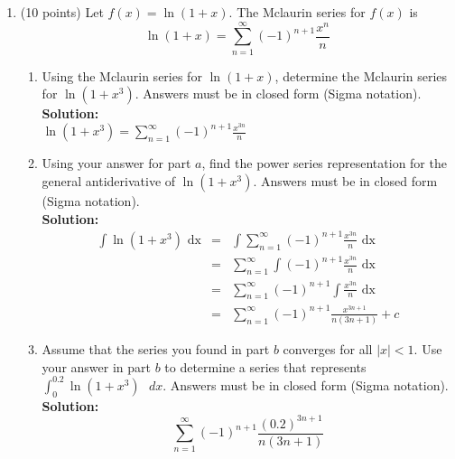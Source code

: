 \documentclass[paper=a4, fontsize=11pt]{scrartcl} %
\numberwithin{equation}{section} %
\numberwithin{figure}{section} %
\numberwithin{table}{section} %
\begin{document}
\begin{enumerate}
\item (10 points) Let $f(x)=\ln (1+x)$.  The Mclaurin series for $f(x)$ is 
\begin{equation*}
\ln (1+x)= \sum\limits_{n=1}^\infty (-1)^{n+1} \frac{x^n}{n}
\end{equation*}
\begin{enumerate}
\item Using the Mclaurin series for $\ln (1+x)$, determine the Mclaurin series for $\ln (1+x^3)$.  Answers must be in closed form (Sigma notation).\\
\noindent\textbf{Solution:}\\
$\ln (1+x^3)= \sum\limits_{n=1}^\infty (-1)^{n+1}\frac{x^{3n}}{n}$

\vspace{.5in}
\item Using your answer for part $a$, find the power series representation for the general antiderivative of $\ln (1+x^3)$. Answers must be in closed form (Sigma notation).\\
\noindent\textbf{Solution:}\\
\begin{eqnarray*}
\int \ln (1+x^3) \text{ dx} &=&  \int \sum\limits_{n=1}^\infty (-1)^{n+1}\frac{x^{3n}}{n} \text{ dx} \\
&=&   \sum\limits_{n=1}^\infty \int (-1)^{n+1}\frac{x^{3n}}{n} \text{ dx} \\
&=&   \sum\limits_{n=1}^\infty  (-1)^{n+1} \int \frac{x^{3n}}{n} \text{ dx} \\
&=&   \sum\limits_{n=1}^\infty  (-1)^{n+1} \frac{x^{3n+1}}{n(3n+1)} + c
\end{eqnarray*}

\vspace{.5in}
\item Assume that the series you found in part $b$ converges for all $|x| < 1$. Use your answer in part $b$ to determine a series that represents $\int_0^{0.2} \ln (1+x^3) \text{ } dx$. Answers must be in closed form (Sigma notation).\\
\noindent\textbf{Solution:}\\
\begin{equation*}
\sum\limits_{n=1}^\infty  (-1)^{n+1} \frac{(0.2)^{3n+1}}{n(3n+1)} 
\end{equation*}

\end{enumerate}

\end{enumerate}

\end{document}

